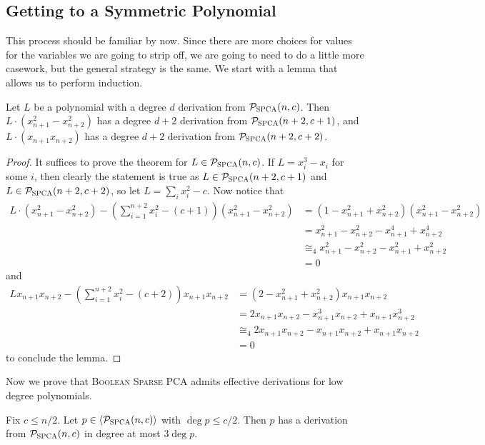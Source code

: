 \subsection{Getting to a Symmetric Polynomial}
This process should be familiar by now. Since there are more choices for values for the variables we are going to strip off, we are going to need to do a little more casework, but the general strategy is the same. We start with a lemma that allows us to perform induction.
\begin{lemma}\label{lem:bpca-induct}
Let $L$ be a polynomial with a degree $d$ derivation from $\mathcal P_{\textsc{SPCA}}(n,c)$. Then $L\cdot (x_{n+1}^2-x_{n+2}^2)$ has a degree $d+2$ derivation from $\mathcal P_{\textsc{SPCA}}(n+2,c+1)$, and $L\cdot (x_{n+1}x_{n+2})$ has a degree $d+2$ derivation from $\mathcal P_{\textsc{SPCA}}(n+2,c+2)$.
\end{lemma}
\begin{proof}
It suffices to prove the theorem for $L \in \mathcal P_{\textsc{SPCA}}(n,c)$. If $L = x_i^3 - x_i$ for some $i$, then clearly the statement is true as $L \in \mathcal P_{\textsc{SPCA}}(n+2,c+1)$ and $L \in \mathcal P_{\textsc{SPCA}}(n+2,c+2)$, so let $L = \sum_i x_i^2 - c$. Now notice that 
\begin{align*}
L\cdot (x_{n+1}^2 - x_{n+2}^2) - \left(\sum_{i=1}^{n+2} x_i^2 - (c+1)\right)(x_{n+1}^2-x_{n+2}^2) &= (1-x_{n+1}^2+x_{n+2}^2)(x_{n+1}^2-x_{n+2}^2) \\
&= x_{n+1}^2 - x_{n+2}^2 - x_{n+1}^4 + x_{n+2}^4  \\
&\cong_4 x_{n+1}^2 - x_{n+2}^2 - x_{n+1}^2 + x_{n+2}^2 \\
&= 0
\end{align*}
and 
\begin{align*}
Lx_{n+1}x_{n+2} - \left(\sum_{i=1}^{n+2} x_i^2 - (c+2)\right)x_{n+1}x_{n+2} &= (2-x_{n+1}^2 + x_{n+2}^2)x_{n+1}x_{n+2} \\
&= 2x_{n+1}x_{n+2} - x_{n+1}^3x_{n+2} + x_{n+1}x_{n+2}^3 \\
&\cong_4 2x_{n+1}x_{n+2} - x_{n+1}x_{n+2} + x_{n+1}x_{n+2} \\
&= 0
\end{align*}
to conclude the lemma. 
\end{proof}
Now we prove that \textsc{Boolean Sparse PCA} admits effective derivations for low degree polynomials.
\begin{lemma}
Fix $c \leq n/2$. Let $p \in \langle \mathcal P_{\textsc{SPCA}}(n,c) \rangle$ with $\deg p \leq c/2$. Then $p$ has a derivation from $\mathcal P_{\textsc{SPCA}}(n,c)$ in degree at most $3\deg p$.
\end{lemma}
